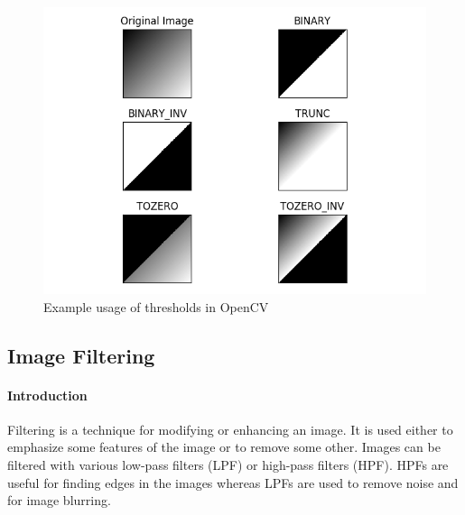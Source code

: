 \begin{figure}
	\centering
	\includegraphics[width=\textwidth]{images/thresholds_example}
	\caption{Example usage of thresholds in OpenCV}
	\label{fig:threshold_examples}
\end{figure}

\subsection{Image Filtering}
\paragraph{Introduction}
Filtering is a technique for modifying or enhancing an image. It is used either to emphasize some features of the image or to remove some other. Images can be filtered with various low-pass filters (LPF) or high-pass filters (HPF). HPFs are useful for finding edges in the images whereas LPFs are used to remove noise and for image blurring.


